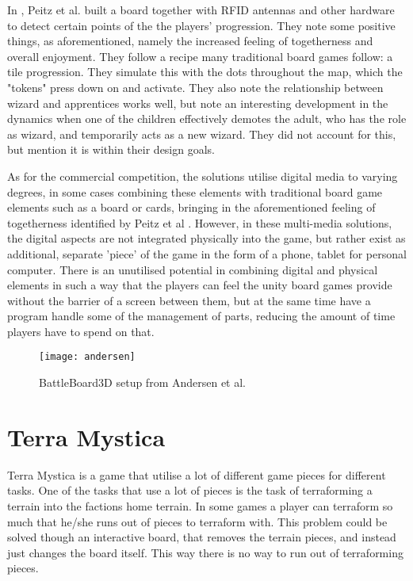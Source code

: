 In \citep{peitzWizards2006}, Peitz et al. built a board together with RFID antennas and other hardware to detect certain points of the the players' progression. They note some positive things, as aforementioned, namely the increased feeling of togetherness and overall enjoyment. They follow a recipe many traditional board games follow: a tile progression. They simulate this with the dots throughout the map, which the "tokens" press down on and activate. They also note the relationship between wizard and apprentices works well, but note an interesting development in the dynamics when one of the children effectively demotes the adult, who has the role as wizard, and temporarily acts as a new wizard. They did not account for this, but mention it is within their design goals.

As for the commercial competition, the solutions utilise digital media to varying degrees, in some cases combining these elements with traditional board game elements such as a board or cards, bringing in the aforementioned feeling of togetherness identified by Peitz et al \citep{peitzWizards2006}. However, in these multi-media solutions, the digital aspects are not integrated physically into the game, but rather exist as additional, separate 'piece' of the game in the form of a phone, tablet for personal computer. There is an unutilised potential in combining digital and physical elements in such a way that the players can feel the unity board games provide without the barrier of a screen between them, but at the same time have a program handle some of the management of parts, reducing the amount of time players have to spend on that.

\begin{figure}[!h]
\centering	
\texttt{[image: andersen]}
\caption{BattleBoard3D setup from Andersen et al.  \citep{andersen_designing_2004}}
\label{fig:andersen}
\end{figure}


\section{Terra Mystica}
Terra Mystica is a game that utilise a lot of different game pieces for different tasks. One of the tasks that use a lot of pieces is the task of terraforming a terrain into the factions home terrain. In some games a player can terraform so much that he/she runs out of pieces to terraform with. This problem could be solved though an interactive board, that removes the terrain pieces, and instead just changes the board itself. This way there is no way to run out of terraforming pieces.

